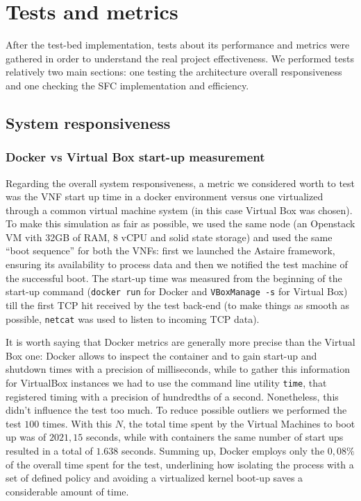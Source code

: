 \chapter{Tests and metrics}

After the test-bed implementation, tests about its performance and metrics were
gathered in order to understand the real project effectiveness. We performed
tests relatively two main sections: one testing the architecture overall
responsiveness and one checking the SFC implementation and efficiency.

\section{System responsiveness}

\subsection{Docker vs Virtual Box start-up measurement}

Regarding the overall system responsiveness, a metric we considered worth to 
test was the VNF start up time in a docker environment versus one virtualized 
through a common virtual machine system (in this case Virtual Box was chosen). 
To make this simulation as fair as possible, we used the same node (an 
Openstack VM vith 32GB of RAM, 8 vCPU and solid state storage) and used the 
same ``boot sequence'' for both the VNFs: first we launched the Astaire 
framework, ensuring its availability to process data and then we notified the 
test machine of the successful boot. The start-up time was measured from the 
beginning of the start-up command (\verb!docker run! for Docker and 
\verb!VBoxManage -s! for Virtual Box) till the first TCP hit received by the 
test back-end (to make things as smooth as possible, \verb!netcat! was used 
to listen to incoming TCP data).

It is worth saying that Docker metrics are generally more precise than the
Virtual Box one: Docker allows to inspect the container and to gain start-up and
shutdown times with a precision of milliseconds, while to gather this 
information for VirtualBox instances we had to use the command line utility 
\verb!time!, that registered timing with a precision of hundredths of a second. 
Nonetheless, this didn't influence the test too much. To reduce possible 
outliers we performed the test $100$ times. With this $N$, the total time spent 
by the Virtual Machines to boot up was of $2021,15$ seconds, while with 
containers the same number of start ups resulted in a total of $1.638$ seconds. 
Summing up, Docker employs only the $0,08\%$ of the overall time spent for the 
test, underlining how isolating the process with a set of defined policy and 
avoiding a virtualized kernel boot-up saves a considerable amount of time.

